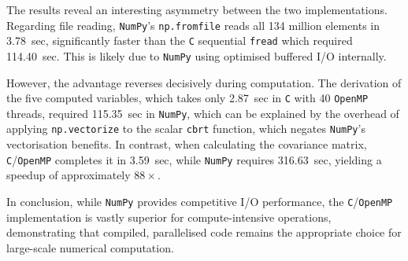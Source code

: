 The results reveal an interesting asymmetry between the two implementations. 
Regarding file reading, \texttt{NumPy}'s \texttt{np.fromfile} reads all 
134 million elements in 3.78~sec, significantly faster than the \texttt{C} 
sequential \texttt{fread} which required 114.40~sec. This is likely due to 
\texttt{NumPy} using optimised buffered I/O internally.

However, the advantage reverses decisively during computation. The derivation 
of the five computed variables, which takes only 2.87~sec in \texttt{C} with 
40 \texttt{OpenMP} threads, required 115.35~sec in \texttt{NumPy}, which can be explained by the overhead of applying \texttt{np.vectorize} to the 
scalar \texttt{cbrt} function, which negates \texttt{NumPy}'s vectorisation 
benefits. In contrast, when calculating the covariance matrix, \texttt{C}/\texttt{OpenMP} completes it in 3.59~sec, while \texttt{NumPy} requires 
316.63~sec, yielding a speedup of approximately $88\times$.

In conclusion, while \texttt{NumPy} provides competitive I/O performance, 
the \texttt{C}/\texttt{OpenMP} implementation is vastly superior for 
compute-intensive operations, demonstrating that compiled, parallelised code 
remains the appropriate choice for large-scale numerical computation.